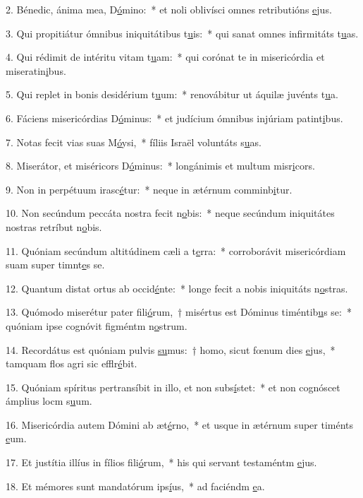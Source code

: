 2. Bénedic, ánima mea, D\uline{ó}mino:~* et noli oblivísci omnes retributións \uline{e}jus.\par 
3. Qui propitiátur ómnibus iniquitátibus t\uline{u}is:~* qui sanat omnes infirmitáts t\uline{u}as.\par 
4. Qui rédimit de intéritu vitam t\uline{u}am:~* qui corónat te in misericórdia et miseratin\uline{i}bus.\par 
5. Qui replet in bonis desidérium t\uline{u}um:~* renovábitur ut áquilæ juvénts t\uline{u}a.\par 
6. Fáciens misericórdias D\uline{ó}minus:~* et judícium ómnibus injúriam patint\uline{i}bus.\par 
7. Notas fecit vias suas M\uline{ó}ysi,~* fíliis Israël voluntáts s\uline{u}as.\par 
8. Miserátor, et miséricors D\uline{ó}minus:~* longánimis et multum misr\uline{i}cors.\par 
9. Non in perpétuum irasc\uline{é}tur:~* neque in ætérnum comminb\uline{i}tur.\par 
10. Non secúndum peccáta nostra fecit n\uline{o}bis:~* neque secúndum iniquitátes nostras retríbut n\uline{o}bis.\par 
11. Quóniam secúndum altitúdinem cæli a t\uline{e}rra:~* corroborávit misericórdiam suam super timnt\uline{e}s se.\par 
12. Quantum distat ortus ab occid\uline{é}nte:~* longe fecit a nobis iniquitáts n\uline{o}stras.\par 
13. Quómodo miserétur pater fili\uline{ó}rum,~† misértus est Dóminus timéntib\uline{u}s se:~* quóniam ipse cognóvit figméntm n\uline{o}strum.\par 
14. Recordátus est quóniam pulvis \uline{su}mus:~† homo, sicut fœnum dies \uline{e}jus,~* tamquam flos agri sic efflr\uline{é}bit.\par 
15. Quóniam spíritus pertransíbit in illo, et non subs\uline{í}stet:~* et non cognóscet ámplius locm s\uline{u}um.\par 
16. Misericórdia autem Dómini ab æt\uline{é}rno,~* et usque in ætérnum super timénts \uline{e}um.\par 
17. Et justítia illíus in fílios fili\uline{ó}rum,~* his qui servant testaméntm \uline{e}jus.\par 
18. Et mémores sunt mandatórum ips\uline{í}us,~* ad faciéndm \uline{e}a.\par 
